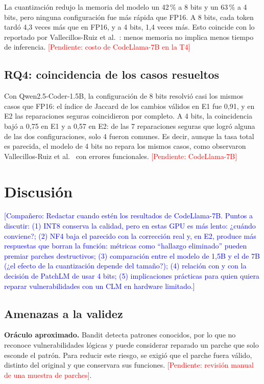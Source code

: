 \documentclass[conference]{IEEEtran}
\newcommand{\pend}[1]{\textcolor{red}{[Pendiente: #1]}}
\newcommand{\comp}[1]{\textcolor{blue}{[Compañero: #1]}}
\begin{document}
La cuantización redujo la memoria del modelo un 42\,\% a 8 bits y un 63\,\% a 4 bits, pero ninguna configuración fue más rápida que FP16. A 8 bits, cada token tardó 4,3 veces más que en FP16, y a 4 bits, 1,4 veces más. Esto coincide con lo reportado por Vallecillos-Ruiz et al.~\cite{vallecillos2026smaller}: menos memoria no implica menos tiempo de inferencia. \pend{costo de CodeLlama-7B en la T4}

\subsection{RQ4: coincidencia de los casos resueltos}

Con Qwen2.5-Coder-1.5B, la configuración de 8 bits resolvió casi los mismos casos que FP16: el índice de Jaccard de los cambios válidos en E1 fue 0,91, y en E2 las reparaciones seguras coincidieron por completo. A 4 bits, la coincidencia bajó a 0,75 en E1 y a 0,57 en E2: de las 7 reparaciones seguras que logró alguna de las dos configuraciones, solo 4 fueron comunes. Es decir, aunque la tasa total es parecida, el modelo de 4 bits no repara los mismos casos, como observaron Vallecillos-Ruiz et al.~\cite{vallecillos2026smaller} con errores funcionales. \pend{CodeLlama-7B}

\section{Discusión}\label{sec:discusion}

\comp{Redactar cuando estén los resultados de CodeLlama-7B. Puntos a discutir:
(1) INT8 conserva la calidad, pero en estas GPU es más lento: ¿cuándo conviene?;
(2) NF4 baja el parecido con la corrección real y, en E2, produce más respuestas que borran la función: métricas como ``hallazgo eliminado'' pueden premiar parches destructivos;
(3) comparación entre el modelo de 1,5B y el de 7B (¿el efecto de la cuantización depende del tamaño?);
(4) relación con \cite{giagnorio2025quantizing,vallecillos2026smaller,haque2025secure} y con la decisión de PatchLM de usar 4 bits;
(5) implicaciones prácticas para quien quiera reparar vulnerabilidades con un CLM en hardware limitado.}

\subsection{Amenazas a la validez}

\textbf{Oráculo aproximado.} Bandit detecta patrones conocidos, por lo que no reconoce vulnerabilidades lógicas y puede considerar reparado un parche que solo esconde el patrón. Para reducir este riesgo, se exigió que el parche fuera válido, distinto del original y que conservara sus funciones. \pend{revisión manual de una muestra de parches}.
\end{document}
